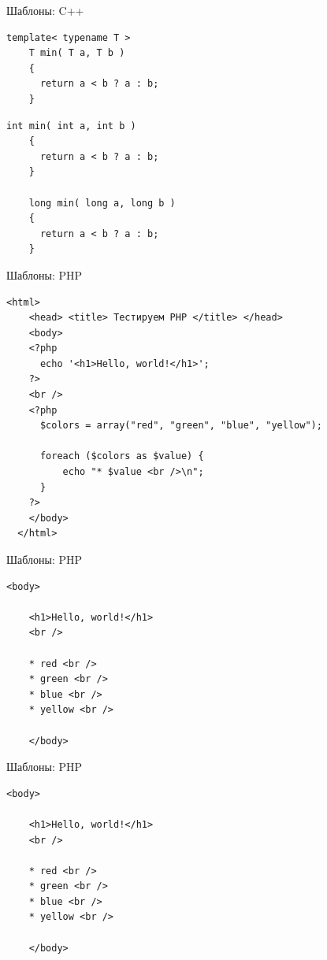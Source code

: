 \begin{frame}[fragile]{Шаблоны: C++}

  \begin{lstlisting}[style=cpp]
    template< typename T >
    T min( T a, T b )
    {
      return a < b ? a : b;
    }
  \end{lstlisting}

  \begin{lstlisting}[style=cpp]
    int min( int a, int b )
    {
      return a < b ? a : b;
    }

    long min( long a, long b )
    {
      return a < b ? a : b;
    }
  \end{lstlisting}

\end{frame}

\begin{frame}[fragile]{Шаблоны: PHP}

  \begin{lstlisting}[style=php]
  <html>
    <head> <title> Тестируем PHP </title> </head>
    <body>
    <?php
      echo '<h1>Hello, world!</h1>';
    ?>
    <br />
    <?php
      $colors = array("red", "green", "blue", "yellow");

      foreach ($colors as $value) {
          echo "* $value <br />\n";
      }
    ?>
    </body>
  </html>
  \end{lstlisting}

\end{frame}

\begin{frame}[fragile]{Шаблоны: PHP}

  \begin{lstlisting}[style=php]
    <body>

    <h1>Hello, world!</h1>
    <br />

    * red <br />
    * green <br />
    * blue <br />
    * yellow <br />

    </body>
  \end{lstlisting}

\end{frame}

\begin{frame}[fragile]{Шаблоны: PHP}

  \begin{lstlisting}[style=php]
    <body>

    <h1>Hello, world!</h1>
    <br />

    * red <br />
    * green <br />
    * blue <br />
    * yellow <br />

    </body>
  \end{lstlisting}

\end{frame}

